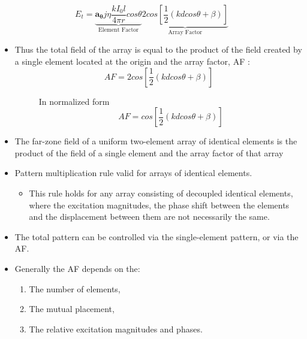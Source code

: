 \documentclass{beamer}
\begin{document}
	\begin{frame}
		\begin{equation} 
		E_t= \underbrace{\mathbf{a_\theta}j\eta\dfrac{kI_0 l}{4\pi r}cos\theta}_\text{Element Factor} \underbrace{2cos\left[\dfrac{1}{2}(kdcos\theta + \beta)  \right]}_\text{Array Factor}
		\end{equation}
		\begin{itemize}
			\item Thus the total field of the array is equal to the product of the field created
			by a single element located at the origin and the array factor, AF :
			\begin{equation}
			AF = 2cos\left[\dfrac{1}{2}(kdcos\theta + \beta)\right]
			\end{equation}
			\begin{description}
				\item[] In normalized form
				\begin{equation}
				AF = cos\left[\dfrac{1}{2}(kdcos\theta + \beta)\right]
				\end{equation}
			\end{description}
			\item The far-zone field of a uniform two-element array of identical elements is the product of the field of a single element and the array factor of that array
		\end{itemize}
	\end{frame}
	\begin{frame}
		\begin{itemize}
			\item Pattern multiplication rule valid for arrays of identical elements. 
			\begin{itemize}
				\item This rule holds for any array consisting of decoupled identical elements, where the excitation magnitudes, the phase shift between the elements and the displacement between them are not necessarily the same. 
			\end{itemize}
			\item The total pattern can be controlled via
			the single-element pattern, or via the AF. 
			\item Generally the AF depends on
			the:
			\begin{enumerate}
				\item The number of elements,
				\item The mutual placement,
				\item The relative excitation magnitudes and phases.
			\end{enumerate}
		\end{itemize}
	\end{frame}
\end{document}
